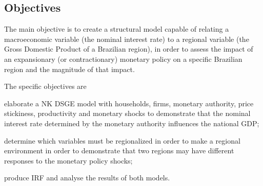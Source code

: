 \documentclass[
thesis.tex
]{subfiles}
\begin{document}
	\subsection*{Objectives}
	
	The main objective is to create a structural model capable of relating a macroeconomic variable (the nominal interest rate) to a regional variable (the Gross Domestic Product of a Brazilian region), in order to assess the impact of an expansionary (or contractionary) monetary policy on a specific Brazilian region and the magnitude of that impact.
	
	The specific objectives are 
	\begin{enumerate*}[label=(\arabic*)]
		\item elaborate a NK DSGE model with households, firms, monetary authority, price stickiness, productivity and monetary shocks to demonstrate that the nominal interest rate determined by the monetary authority influences the national GDP; 
		\item determine which variables must be regionalized in order to make a regional environment in order to demonstrate that two regions may have different responses to the monetary policy shocks; 
		\item produce IRF and analyse the results of both models.
	\end{enumerate*}	
\end{document}

